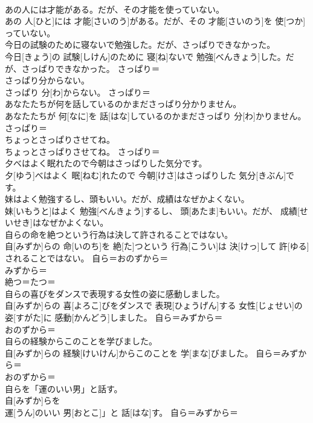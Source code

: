 \documentclass[8pt]{extreport}
\begin{document}
\begin{CJK}{UTF8}{min}
\\	あの人には才能がある。だが、その才能を使っていない。	
\\	あの 人[ひと]には 才能[さいのう]がある。だが、その 才能[さいのう]を 使[つか]っていない。	
\\	今日の試験のために寝ないで勉強した。だが、さっぱりできなかった。	
\\	今日[きょう]の 試験[しけん]のために 寝[ね]ないで 勉強[べんきょう]した。だが、さっぱりできなかった。	さっぱり＝ 
\\	さっぱり分からない。	
\\	さっぱり 分[わ]からない。	さっぱり＝ 
\\	あなたたちが何を話しているのかまださっぱり分かりません。	
\\	あなたたちが 何[なに]を 話[はな]しているのかまださっぱり 分[わ]かりません。	さっぱり＝ 
\\	ちょっとさっぱりさせてね。	
\\	ちょっとさっぱりさせてね。	さっぱり＝ 
\\	夕べはよく眠れたので今朝はさっぱりした気分です。	
\\	夕[ゆう]べはよく 眠[ねむ]れたので 今朝[けさ]はさっぱりした 気分[きぶん]です。	
\\	妹はよく勉強するし、頭もいい。だが、成績はなぜかよくない。	
\\	妹[いもうと]はよく 勉強[べんきょう]するし、 頭[あたま]もいい。だが、 成績[せいせき]はなぜかよくない。	
\\	自らの命を絶つという行為は決して許されることではない。	
\\	自[みずか]らの 命[いのち]を 絶[た]つという 行為[こうい]は 決[けっ]して 許[ゆる]されることではない。	自ら＝おのずから＝ 
\\	みずから＝ 
\\	絶つ＝たつ＝ 
\\	自らの喜びをダンスで表現する女性の姿に感動しました。	
\\	自[みずか]らの 喜[よろこ]びをダンスで 表現[ひょうげん]する 女性[じょせい]の 姿[すがた]に 感動[かんどう]しました。	自ら＝みずから＝ 
\\	おのずから＝ 
\\	自らの経験からこのことを学びました。	
\\	自[みずか]らの 経験[けいけん]からこのことを 学[まな]びました。	自ら＝みずから＝ 
\\	おのずから＝ 
\\	自らを「運のいい男」と話す。	
\\	自[みずか]らを
\\	運[うん]のいい 男[おとこ]」と 話[はな]す。	自ら＝みずから＝ 

\end{CJK}
\end{document}

